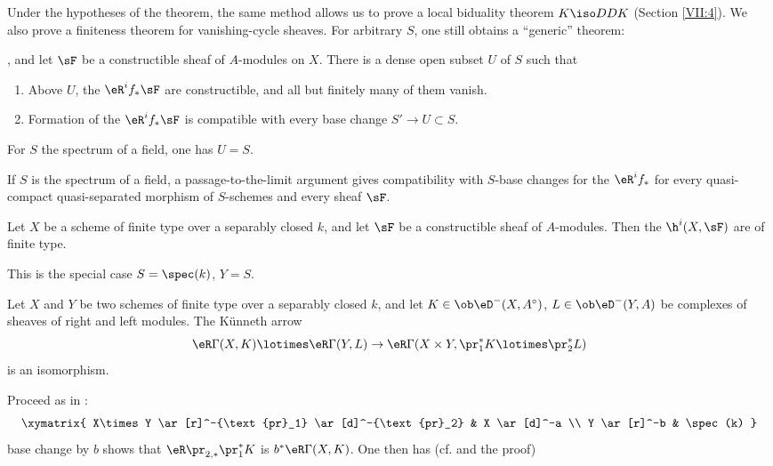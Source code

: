 Under the hypotheses of the theorem, the same method allows us to prove a
local biduality theorem $K\iso D D K$ (Section \ref{VII:4}). We also prove a
finiteness theorem for vanishing-cycle sheaves. For arbitrary $S$, one still
obtains a ``generic'' theorem:






\begin{theorem_}\label{VII:1-9}
, and let $\sF$ be
a constructible sheaf of $A$-modules on $X$. There is a dense open subset
$U$ of $S$ such that
\begin{enumerate}[\indent (i)]
  \item Above $U$, the $\eR^i f_\ast \sF$ are constructible, and all but
    finitely many of them vanish.
  \item Formation of the $\eR^i f_\ast \sF$ is compatible with every base
    change $S' \to U\subset S$.
\end{enumerate}
\end{theorem_}

For $S$ the spectrum of a field, one has $U=S$.

If $S$ is the spectrum of a field, a passage-to-the-limit argument gives
compatibility with $S$-base changes for the $\eR^i f_\ast$ for every
quasi-compact quasi-separated morphism of $S$-schemes and every sheaf $\sF$.






\begin{corollary_}\label{VII:1-10}
Let $X$ be a scheme of finite type over a separably closed $k$, and let
$\sF$ be a constructible sheaf of $A$-modules. Then the $\h^i(X,\sF)$ are of
finite type.
\end{corollary_}

This is the special case $S=\spec(k)$, $Y=S$.

\begin{corollary_}\label{VII:1-11}
Let $X$ and $Y$ be two schemes of finite type over a separably closed $k$,
and let $K\in \ob\eD^-(X,A^\circ)$,
$L\in \ob\eD^-(Y,A)$ be complexes of sheaves of right and left modules. The
K\"unneth arrow
\[
  \eR \Gamma(X,K) \lotimes \eR \Gamma(Y,L) \to \eR\Gamma(X\times Y,\pr_1^\ast K \lotimes \pr_2^\ast L)
\]
is an isomorphism.
\end{corollary_}

Proceed as in :
\[\xymatrix{
  X\times Y \ar[r]^-{\text{pr}_1} \ar[d]^-{\text{pr}_2}
    & X \ar[d]^-a \\
  Y \ar[r]^-b
    & \spec(k)
}\]
base change by $b$ shows that $\eR\pr_{2,\ast}{} \pr_1^\ast K$ is
$b^\ast \eR\Gamma(X,K)$. One then has (cf.
 and the proof)

